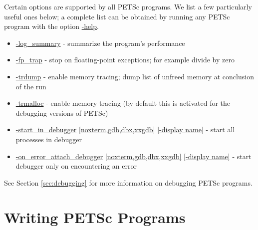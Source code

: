 Certain options are supported by all PETSc programs.  We list a few 
particularly useful ones below; a complete list can be obtained by 
running any PETSc program with the option \url{-help}.
\begin{itemize}
\item \url{-log_summary} - summarize the program's performance
\item \url{-fp_trap} - stop on floating-point exceptions; 
      for example divide by zero
\item \url{-trdump} - enable memory tracing; dump list of unfreed memory 
      at conclusion  of the run
\item \url{-trmalloc} - enable memory tracing (by default this is 
      activated for the debugging versions of PETSc)
\item \url{-start_in_debugger} \url{[noxterm,gdb,dbx,xxgdb]} \url{[-display name]} 
     - start all processes in debugger  
\item \url{-on_error_attach_debugger}  \url{[noxterm,gdb,dbx,xxgdb]}
      \url{[-display name]} - start debugger only on encountering an error
\end{itemize}
See Section \ref{sec:debugging} for more information on debugging PETSc programs.

\section{Writing PETSc Programs}
\label{sec:writing}

